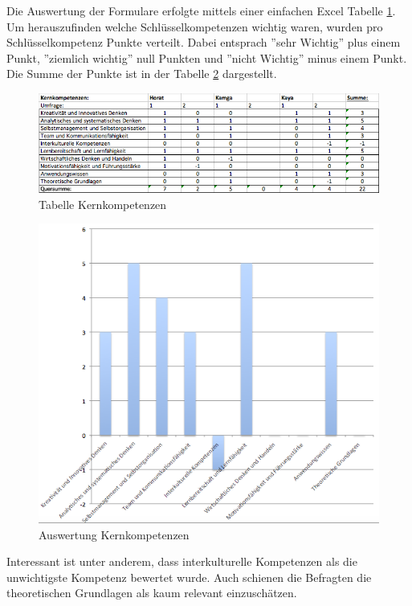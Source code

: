 Die Auswertung der Formulare erfolgte mittels einer einfachen Excel Tabelle \ref{fig:tabkernkomp}. Um herauszufinden welche Schlüsselkompetenzen wichtig waren, wurden pro Schlüsselkompetenz Punkte verteilt. Dabei entsprach ''sehr Wichtig'' plus einem Punkt, ''ziemlich wichtig'' null Punkten und ''nicht Wichtig'' minus einem Punkt. Die Summe der Punkte ist in der Tabelle \ref{fig:auswerkomp} dargestellt. 

\begin{figure}[ht]
	\centering
	\includegraphics[width=1.2\textwidth]{images/Tabelle_Kernkompetenzen.png}
	\caption{Tabelle Kernkompetenzen}
	\label{fig:tabkernkomp}
\end{figure}

\begin{figure}[ht]
	\centering
	\includegraphics[width=1.1\textwidth]{images/Auswertung_kernkompetenzen.png}
	\caption{Auswertung Kernkompetenzen}
	\label{fig:auswerkomp}
\end{figure}


Interessant ist unter anderem, dass interkulturelle Kompetenzen als die unwichtigste Kompetenz bewertet wurde. Auch schienen die Befragten die theoretischen Grundlagen als kaum relevant einzuschätzen.

